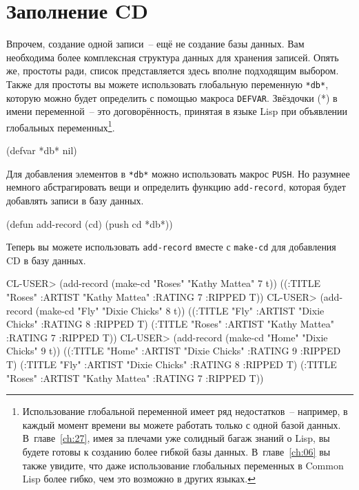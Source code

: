 \section{Заполнение CD}

Впрочем, создание одной записи~-- ещё не создание базы данных. Вам необходима более
комплексная структура данных для хранения записей. Опять же, простоты ради, список
представляется здесь вполне подходящим выбором. Также для простоты вы можете использовать
глобальную переменную \lstinline{*db*}, которую можно будет определить с помощью макроса
\lstinline{DEFVAR}. Звёздочки (*) в имени переменной~-- это договорённость, принятая в языке
Lisp при объявлении глобальных переменных\footnote{Использование глобальной переменной
  имеет ряд недостатков~-- например, в каждый момент времени вы можете работать только с
  одной базой данных.  В~главе~\ref{ch:27}, имея за плечами уже солидный багаж знаний о Lisp,
  вы будете готовы к созданию более гибкой базы данных. В~главе~\ref{ch:06} вы также
  увидите, что даже использование глобальных переменных в Common Lisp более гибко, чем это
  возможно в других языках.}.

\begin{myverb}
(defvar *db* nil)
\end{myverb}

Для добавления элементов в \lstinline{*db*} можно использовать макрос \lstinline{PUSH}. Но
разумнее немного абстрагировать вещи и определить функцию \lstinline{add-record}, которая будет
добавлять записи в базу данных.

\begin{myverb}
(defun add-record (cd) (push cd *db*))
\end{myverb}

Теперь вы можете использовать \lstinline{add-record} вместе с \lstinline{make-cd} для добавления CD
в базу данных.

\begin{myverb}
CL-USER> (add-record (make-cd "Roses" "Kathy Mattea" 7 t))
((:TITLE "Roses" :ARTIST "Kathy Mattea" :RATING 7 :RIPPED T))
CL-USER> (add-record (make-cd "Fly" "Dixie Chicks" 8 t))
((:TITLE "Fly" :ARTIST "Dixie Chicks" :RATING 8 :RIPPED T)
 (:TITLE "Roses" :ARTIST "Kathy Mattea" :RATING 7 :RIPPED T))
CL-USER> (add-record (make-cd "Home" "Dixie Chicks" 9 t))
((:TITLE "Home" :ARTIST "Dixie Chicks" :RATING 9 :RIPPED T)
 (:TITLE "Fly" :ARTIST "Dixie Chicks" :RATING 8 :RIPPED T)
 (:TITLE "Roses" :ARTIST "Kathy Mattea" :RATING 7 :RIPPED T))
\end{myverb}

